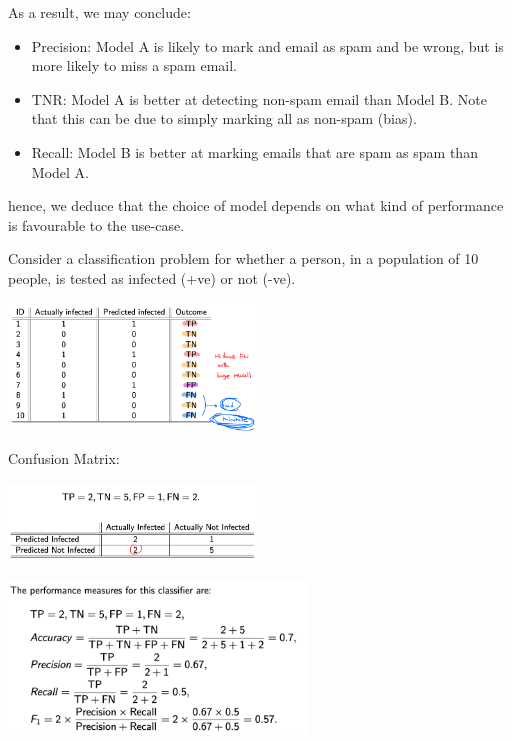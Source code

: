 \documentclass{tron}
\begin{document}
\begin{example}{}
	As a result, we may conclude:
	\begin{itemize}
		\item Precision: Model A is likely to mark and email as spam and be wrong, but is more likely to miss a spam email.
		\item TNR: Model A is better at detecting non-spam email than Model B. Note that this can be due to simply marking all as non-spam (bias).
		\item Recall: Model B is better at marking emails that are spam as spam than Model A.
	\end{itemize}
	
	hence, we deduce that the choice of model depends on what kind of performance is favourable to the use-case.
\end{example}

\begin{example}{}
	Consider a classification problem for whether a person, in a population of 10 people, is tested as infected (+ve) or not (-ve).
	
	\includegraphics[width = 250px]{Figs/Lec7/ex2-table}
	
	Confusion Matrix:
	
	\includegraphics[width = 250px]{Figs/Lec7/ex2-conf-mat}
	
	\includegraphics[width = 300px]{Figs/Lec7/ex2-perform measure}
	

\end{example}
\end{document}
